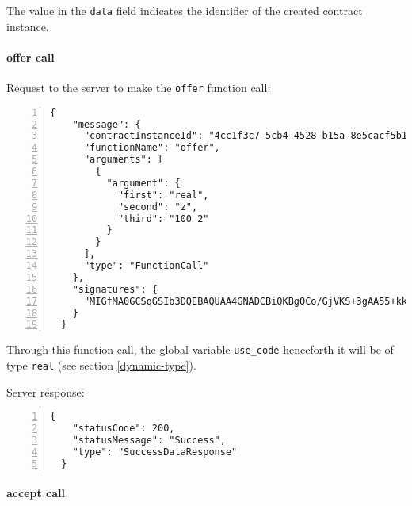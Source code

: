 The value in the \verb|data| field indicates the identifier of the created contract instance.

\paragraph{offer call}

Request to the server to make the \verb|offer| function call:
\begin{Verbatim}[numbers=left,xleftmargin=1cm,firstnumber=1,breaklines=true,breakanywhere=true,tabsize=2]
  {
    "message": {
      "contractInstanceId": "4cc1f3c7-5cb4-4528-b15a-8e5cacf5b18a",
      "functionName": "offer",
      "arguments": [
        {
          "argument": {
            "first": "real",
            "second": "z",
            "third": "100 2"
          }
        }
      ],
      "type": "FunctionCall"
    },
    "signatures": {
      "MIGfMA0GCSqGSIb3DQEBAQUAA4GNADCBiQKBgQCo/GjVKS+3gAA55+kko41yINdOcCLQMSBQyuTTkKHE1mhu/TgOpivM0wLPsSga8hQMr3+v3aR0IF/vfCRf6SdiXmWx/jflmEXtnT6fkGcnV6dGNUpHWXSpwUIDt0N88jfnEqekx4S+KDCKg99sGEeHeT65fKS8lB0gjHMt9AOriwIDAQAB": "bJ0xnIhcDlPMmKYx7h8jjX8Q7PaSdqxRg7xq/zTM0vEKqJVDIN0JcT8Qj7jEX5Pwm2YOq+kSwEAxqlPzwoZoQNhe6FPyz6dbj9/LQ0rg79x4QD5ZrCawpcbbtJ/U5l1RPGvl06EdHeQc4YFlsIW4yywD1XlKtfJc7IJwes/iKrE="
    }
  }
\end{Verbatim}

Through this function call, the global variable \verb|use_code| henceforth it will be of type \verb|real| 
(see section \ref{dynamic-type}).

Server response:
\begin{Verbatim}[numbers=left,xleftmargin=1cm,firstnumber=1,breaklines=true,breakanywhere=true,tabsize=2]
  {
    "statusCode": 200,
    "statusMessage": "Success",
    "type": "SuccessDataResponse"
  }
\end{Verbatim}

\paragraph{accept call}


